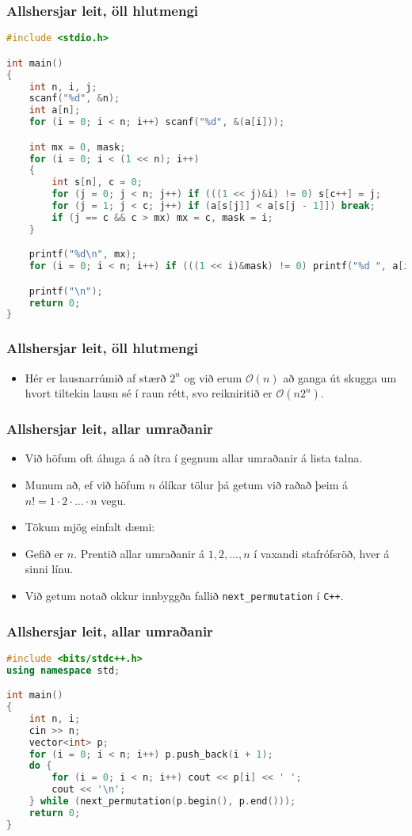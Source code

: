 \documentclass{beamer}
\renewcommand\O{\mathcal{O}}
\begin{document}
\begin{frame}[fragile]
	\frametitle{Allshersjar leit, öll hlutmengi}
\tiny
\begin{lstlisting}[language=C]
#include <stdio.h>

int main()
{
	int n, i, j;
	scanf("%d", &n);
	int a[n];
	for (i = 0; i < n; i++) scanf("%d", &(a[i]));

	int mx = 0, mask;
	for (i = 0; i < (1 << n); i++)
	{
		int s[n], c = 0;
		for (j = 0; j < n; j++) if (((1 << j)&i) != 0) s[c++] = j;
		for (j = 1; j < c; j++) if (a[s[j]] < a[s[j - 1]]) break;
		if (j == c && c > mx) mx = c, mask = i;
	}

	printf("%d\n", mx);
	for (i = 0; i < n; i++) if (((1 << i)&mask) != 0) printf("%d ", a[i]);

	printf("\n");
	return 0;
}
\end{lstlisting}
\end{frame}

\begin{frame}
	\frametitle{Allshersjar leit, öll hlutmengi}
\begin{itemize}
	\item<1-> Hér er lausnarrúmið af stærð $2^n$ og við erum $\O(n)$ að ganga út skugga um hvort tiltekin lausn sé í raun rétt, svo reikniritið er
		$\O(n2^n)$.
\end{itemize}
\end{frame}

\begin{frame}
	\frametitle{Allshersjar leit, allar umraðanir}
\begin{itemize}
	\item<1-> Við höfum oft áhuga á að ítra í gegnum allar umraðanir á lista talna.
	\item<2-> Munum að, ef við höfum $n$ ólíkar tölur þá getum við raðað þeim á $n! = 1 \cdot 2 \cdot ... \cdot n$ vegu.
	\item<3-> Tökum mjög einfalt dæmi:
	\item<4-> Gefið er $n$. Prentið allar umraðanir á $1, 2, ..., n$ í vaxandi stafrófsröð, hver á sinni línu.
	\item<5-> Við getum notað okkur innbyggða fallið \texttt{next\_permutation} í \texttt{C++}.
\end{itemize}
\end{frame}

\begin{frame}[fragile]
	\frametitle{Allshersjar leit, allar umraðanir}
\tiny
\begin{lstlisting}[language=C++]
#include <bits/stdc++.h>
using namespace std;

int main()
{
	int n, i;
	cin >> n;
	vector<int> p;
	for (i = 0; i < n; i++) p.push_back(i + 1);
	do {
		for (i = 0; i < n; i++) cout << p[i] << ' ';
		cout << '\n';
	} while (next_permutation(p.begin(), p.end()));
	return 0;
}
\end{lstlisting}
\end{frame}
\end{document}
